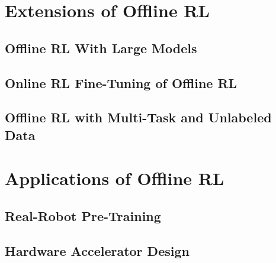 \documentclass[letterpaper,12pt, oneside]{lib/ucthesis}
\begin{document}
\begin{dissertationText}
% 	

% 	

\part{Extensions of Offline RL}

\chapter{Offline RL With Large Models}
	

\chapter{Online RL Fine-Tuning of Offline RL}
	

\chapter{Offline RL with Multi-Task and Unlabeled Data}
	

\part{Applications of Offline RL}

\chapter{Real-Robot Pre-Training}
	

\chapter{Hardware Accelerator Design}
	

% 	


\end{dissertationText}
\end{document}
